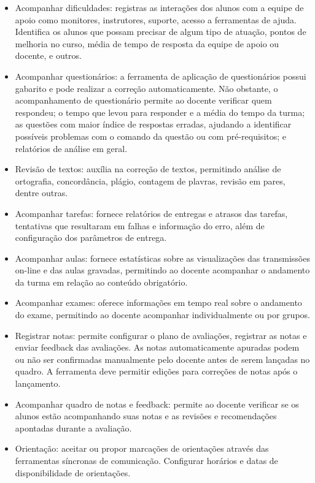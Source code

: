 \begin{itemize}
\item Acompanhar dificuldades: registras as interações dos alunos com a equipe de apoio como monitores, instrutores, suporte, acesso a ferramentas de ajuda. Identifica os alunos que possam precisar de algum tipo de atuação, pontos de melhoria no curso, média de tempo de resposta da equipe de apoio ou docente, e outros. 

\item Acompanhar questionários: a ferramenta de aplicação de questionários possui gabarito e pode realizar a correção automaticamente. Não obstante, o acompanhamento de questionário permite ao docente verificar quem respondeu; o tempo que levou para responder e a média do tempo da turma; as questões com maior índice de respostas erradas, ajudando a identificar possíveis problemas com o comando da questão ou com pré-requisitos; e relatórios de análise em geral.

\item Revisão de textos: auxília na correção de textos, permitindo análise de ortografia, concordância, plágio, contagem de plavras, revisão em pares, dentre outras.

\item Acompanhar tarefas: fornece relatórios de entregas e atrasos das tarefas, tentativas que resultaram em falhas e informação do erro, além de configuração dos parâmetros de entrega.

\item Acompanhar aulas: fornece estatísticas sobre as visualizações das transmissões on-line e das aulas gravadas, permitindo ao docente acompanhar o andamento da turma em relação ao conteúdo obrigatório.

\item Acompanhar exames: oferece informações em tempo real sobre o andamento do exame, permitindo ao docente acompanhar individualmente ou por grupos. 

\item Registrar notas: permite configurar o plano de avaliações, registrar as notas e enviar feedback das avaliações. As notas automaticamente apuradas podem ou não  ser confirmadas manualmente pelo docente antes de serem lançadas no quadro. A ferramenta deve permitir edições para correções de notas após o lançamento.

\item Acompanhar quadro de notas e feedback: permite ao docente verificar se os alunos estão acompanhando suas notas e as revisões e recomendações apontadas durante a avaliação.

\item Orientação: aceitar ou propor marcações de orientações através das ferramentas síncronas de comunicação. Configurar horários e datas de disponibilidade de orientações.

\end{itemize}

